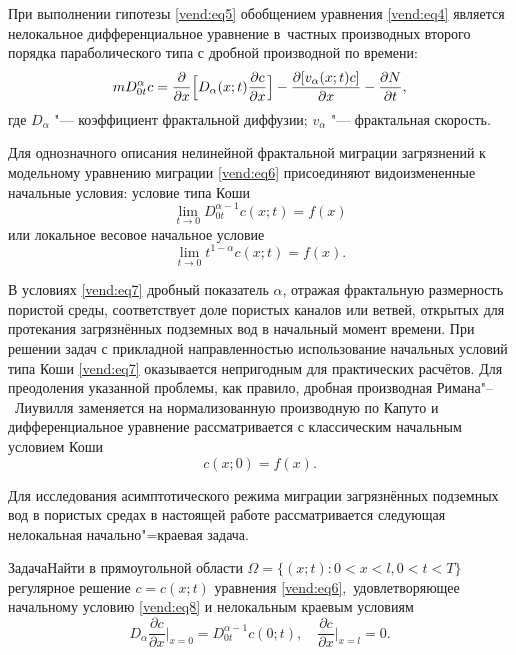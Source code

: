 При выполнении гипотезы \eqref{vend:eq5} обобщением уравнения \eqref{vend:eq4} является 
нелокальное дифференциальное уравнение в~частных производных второго порядка 
параболического типа с дробной производной по времени:
\begin{equation}
\label{vend:eq6}
mD_{0t}^\alpha c=\frac{\partial}{\partial x}\Bigl[D_\alpha(x;t)\frac{\partial c}{\partial x}\Bigr]-\frac{\partial[v_\alpha(x;t)c]}{\partial x}-\frac{\partial N}{\partial t},
\end{equation}
где $D_\alpha$ "--- коэффициент фрактальной диффузии; $v_\alpha $ "--- 
фрактальная скорость. 

Для однозначного описания нелинейной фрактальной миграции загрязнений к 
модельному уравнению миграции \eqref{vend:eq6} присоединяют \cite{ven:bib:4} видоизмененные начальные 
условия:  условие типа Коши
\begin{equation}
\label{vend:eq7}
\lim\limits_{t\to0}D_{0t}^{\alpha-1}c(x;t)=f(x)
\end{equation}
или локальное весовое начальное условие
$$\lim\limits_{t\to0}t^{1-\alpha}c(x;t)=f(x).$$

В условиях \eqref{vend:eq7} дробный показатель $\alpha$, отражая фрактальную размерность 
пористой среды, соответствует доле пористых каналов или ветвей, открытых для 
протекания загрязнённых подземных вод в начальный момент времени. При 
решении задач с прикладной направленностью использование начальных условий 
типа Коши \eqref{vend:eq7} оказывается непригодным для практических расчётов.  
Для преодоления указанной проблемы, как правило, дробная производная Римана"--~Лиувилля заменяется на нормализованную производную по Капуто и дифференциальное уравнение
рассматривается с классическим начальным условием Коши 
\begin{equation}
\label{vend:eq8}
c(x;0)=f(x).
\end{equation}

Для исследования асимптотического режима миграции загрязнённых 
подземных вод в пористых средах в настоящей работе рассматривается следующая нелокальная 
начально"=краевая задача.

\begin{newthm}{Задача}Найти в прямоугольной области $\Omega=\{(x;t): 0<x<l, 0<t<T\}$ регулярное решение $c=c(x;t)$ уравнения \eqref{vend:eq6}$,$ удовлетворяющее начальному условию  \eqref{vend:eq8} и нелокальным краевым условиям 
\[
D_\alpha\frac{\partial c}{\partial x}\Big\rvert_{x = 0}=D^{\alpha-1}_{0t}c(0;t),
\quad
\frac{\partial c}{\partial x}\Big\rvert_{x=l}=0.
\]
\end{newthm}

